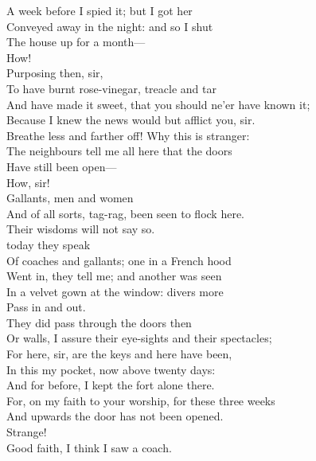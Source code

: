 \documentclass[a4paper,oneside,12pt]{memoir}
\begin{document}
\begin{drama*}
A week before I spied it; but I got her\\
Conveyed away in the night: and so I shut\\
The house up for a month---\\
\lovewitspeaks {} How!\\
\facespeaks {} Purposing then, sir,\\
To have burnt rose-vinegar, treacle and tar\\
And have made it sweet, that you should ne'er have known it;\\
Because I knew the news would but afflict you, sir.\\
\lovewitspeaks Breathe less and farther off! Why this is stranger:\\
The neighbours tell me all here that the doors\\
Have still been open---\\
\facespeaks {} How, sir!\\
\lovewitspeaks {} Gallants, men and women\\
And of all sorts, tag-rag, been seen to flock here.\\
\facespeaks Their wisdoms will not say so.\\
\lovewitspeaks {} today they speak\\
Of coaches and gallants; one in a French hood\\
Went in, they tell me; and another was seen\\
In a velvet gown at the window: divers more\\
Pass in and out.\\
\facespeaks {} They did pass through the doors then\\
Or walls, I assure their eye-sights and their spectacles;\\
For here, sir, are the keys and here have been,\\
In this my pocket, now above twenty days:\\
And for before, I kept the fort alone there.\\
For, on my faith to your worship, for these three weeks\\
And upwards the door has not been opened.\\
\lovewitspeaks Strange!\\
\neighonespeaks {} Good faith, I think I saw a coach.\\

\end{drama*}
\end{document}
